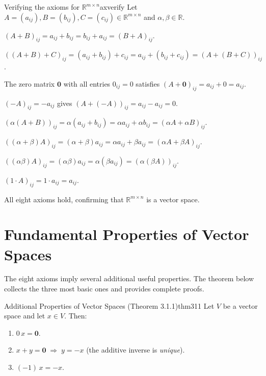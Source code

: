 \documentclass[12pt]{article}
\newcommand{\R}{\mathbb{R}}
\newcommand{\vzero}{\mathbf{0}}
\begin{document}
	\begin{example}{Verifying the axioms for $\R^{m\times n}$}{axverify}
		Let $A=(a_{ij}), B=(b_{ij}), C=(c_{ij}) \in \R^{m\times n}$ and
		$\alpha,\beta\in\R$.
		
		\begin{description}[leftmargin=2em, font=\bfseries\color{axiomblue}]
			\item[A1.] $(A+B)_{ij} = a_{ij}+b_{ij} = b_{ij}+a_{ij} = (B+A)_{ij}$.
			\item[A2.] $((A+B)+C)_{ij} = (a_{ij}+b_{ij})+c_{ij}
			= a_{ij}+(b_{ij}+c_{ij}) = (A+(B+C))_{ij}$.
			\item[A3.] The zero matrix $\vzero$ with all entries $0_{ij}=0$ satisfies
			$(A+\vzero)_{ij} = a_{ij}+0 = a_{ij}$.
			\item[A4.] $(-A)_{ij} = -a_{ij}$ gives $(A+(-A))_{ij} = a_{ij}-a_{ij} = 0$.
			\item[A5.] $(\alpha(A+B))_{ij} = \alpha(a_{ij}+b_{ij})
			= \alpha a_{ij}+\alpha b_{ij} = (\alpha A+\alpha B)_{ij}$.
			\item[A6.] $((\alpha+\beta)A)_{ij} = (\alpha+\beta)a_{ij}
			= \alpha a_{ij}+\beta a_{ij} = (\alpha A+\beta A)_{ij}$.
			\item[A7.] $((\alpha\beta)A)_{ij} = (\alpha\beta)a_{ij}
			= \alpha(\beta a_{ij}) = (\alpha(\beta A))_{ij}$.
			\item[A8.] $(1\cdot A)_{ij} = 1\cdot a_{ij} = a_{ij}$.
		\end{description}
		All eight axioms hold, confirming that $\R^{m\times n}$ is a vector space.
	\end{example}
	
	
	\section{Fundamental Properties of Vector Spaces}

	
	\noindent
	The eight axioms imply several additional useful properties.  The theorem below
	collects the three most basic ones and provides complete proofs.
	
	\begin{theorem}{Additional Properties of Vector Spaces (Theorem 3.1.1)}{thm311}
		Let $V$ be a vector space and let $x \in V$.  Then:
		\begin{enumerate}[label=(\roman*), leftmargin=2.5em]
			\item $0\, x = \vzero$.
			\item $x + y = \vzero \;\Longrightarrow\; y = -x$ \quad
			(the additive inverse is \emph{unique}).
			\item $(-1)\, x = -x$.
		\end{enumerate}
	\end{theorem}
	
\end{document}

